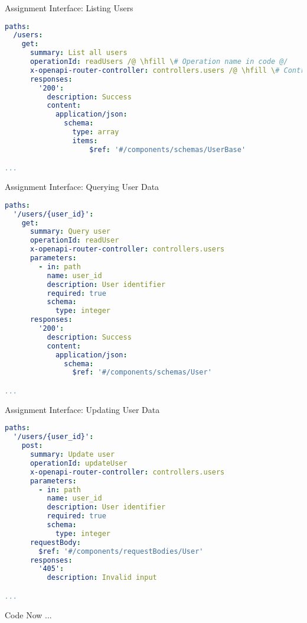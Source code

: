 \begin{frame}[fragile]{Assignment Interface: Listing Users}
\begin{lstlisting}[language=yaml,style=mini]
paths:
  /users:
    get:
      summary: List all users
      operationId: readUsers /@ \hfill \# Operation name in code @/
      x-openapi-router-controller: controllers.users /@ \hfill \# Controller name in code @/
      responses:
        '200':
          description: Success
          content:
            application/json:
              schema:
                type: array
                items:
                    $ref: '#/components/schemas/UserBase'

...
\end{lstlisting}
\end{frame}


\begin{frame}[fragile]{Assignment Interface: Querying User Data}
\begin{lstlisting}[language=yaml,style=mini]
paths:
  '/users/{user_id}':
    get:
      summary: Query user
      operationId: readUser
      x-openapi-router-controller: controllers.users
      parameters:
        - in: path
          name: user_id
          description: User identifier
          required: true
          schema:
            type: integer
      responses:
        '200':
          description: Success
          content:
            application/json:
              schema:
                $ref: '#/components/schemas/User'

...
\end{lstlisting}
\end{frame}


\begin{frame}[fragile]{Assignment Interface: Updating User Data}
\begin{lstlisting}[language=yaml,style=mini]
paths:
  '/users/{user_id}':
    post:
      summary: Update user
      operationId: updateUser
      x-openapi-router-controller: controllers.users
      parameters:
        - in: path
          name: user_id
          description: User identifier
          required: true
          schema:
            type: integer
      requestBody:
        $ref: '#/components/requestBodies/User'
      responses:
        '405':
          description: Invalid input

...
\end{lstlisting}
\end{frame}


\begin{frame}{Code Now ...}
\end{frame}


